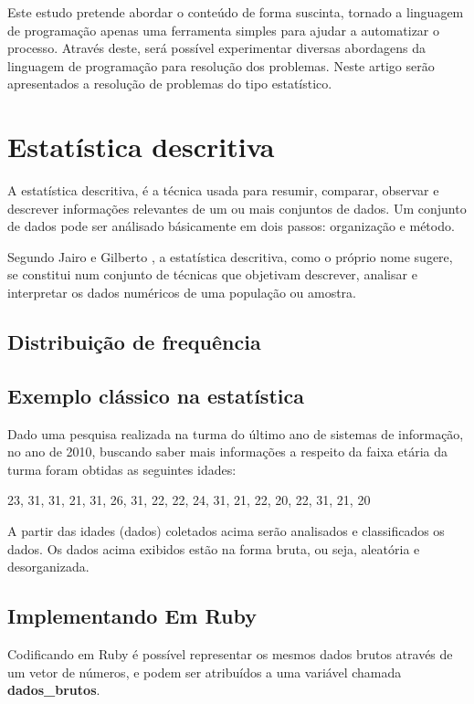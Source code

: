 \documentclass[12pt]{article}
\newcommand{\code}[1] {\textbf{#1}}
\begin{document}
Este estudo pretende abordar o conteúdo de forma suscinta, tornado a linguagem de programação apenas uma ferramenta simples para ajudar a automatizar o processo. Através deste, será possível experimentar diversas abordagens da linguagem de programação para resolução dos problemas. Neste artigo serão apresentados a resolução de problemas do tipo estatístico.


\section {Estatística descritiva}

A estatística descritiva, é a técnica usada para resumir, comparar, observar e descrever informações relevantes de um ou mais conjuntos de dados. Um conjunto de dados pode ser análisado básicamente em dois passos: organização e método.

Segundo Jairo e Gilberto \cite{cursoEstatistica}, a estatística descritiva, como o próprio nome sugere, se constitui num conjunto de técnicas que objetivam descrever, analisar e interpretar os dados numéricos de uma população ou amostra.


\subsection{ Distribuição de frequência } 

\subsection { Exemplo clássico na estatística }

Dado uma pesquisa realizada na turma do último ano de sistemas de informação, no ano de 2010, buscando saber mais informações a respeito da faixa etária da turma foram obtidas as seguintes idades:

23, 31, 31, 21, 31, 26, 31, 22, 22, 24, 31, 21, 22, 20, 22, 31, 21, 20

A partir das idades (dados) coletados acima serão analisados e classificados os dados. Os dados acima exibidos estão na forma bruta, ou seja, aleatória e desorganizada. 

\subsection { Implementando Em Ruby }

Codificando em Ruby é possível representar os mesmos dados brutos através de um vetor de números, e podem ser atribuídos a uma variável chamada \code{dados\_brutos}.
\end{document}
